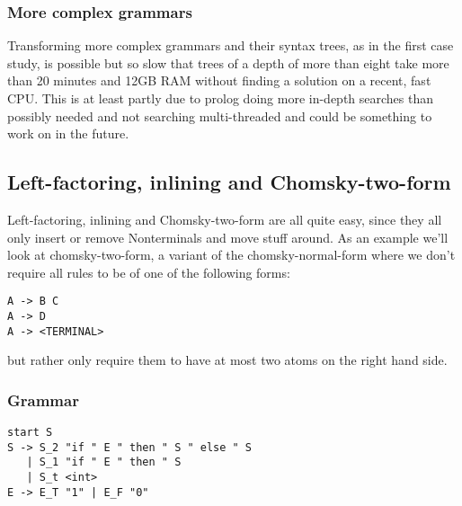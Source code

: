 \documentclass[a4paper]{article}
\begin{document}
\subsubsection*{More complex grammars}
Transforming more complex grammars and their syntax trees, as in the first case study, is possible but so slow that trees of a depth of more than eight take more than 20 minutes and 12GB RAM without finding a solution on a recent, fast CPU. This is at least partly due to prolog doing more in-depth searches than possibly needed and not searching multi-threaded and could be something to work on in the future.

\subsection*{Left-factoring, inlining and Chomsky-two-form}
Left-factoring, inlining and Chomsky-two-form are all quite easy, since they all only insert or remove Nonterminals and move stuff around. As an example we'll look at chomsky-two-form, a variant of the chomsky-normal-form where we don't require all rules to be of one of the following forms:
\begin{verbatim}
A -> B C
A -> D
A -> <TERMINAL>
\end{verbatim}
but rather only require them to have at most two atoms on the right hand side.
\subsubsection*{Grammar}
\begin{verbatim}
start S
S -> S_2 "if " E " then " S " else " S 
   | S_1 "if " E " then " S 
   | S_t <int>
E -> E_T "1" | E_F "0"
\end{verbatim}
\end{document}
